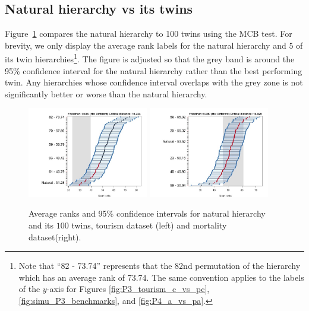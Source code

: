 \documentclass[a4paper,review,12pt,authoryear]{elsarticle}
\begin{document}
\subsection{Natural hierarchy vs its twins}

\label{subsec:n_vs_pn}


Figure~\ref{fig:P2_tourism} compares the natural hierarchy to 100 twins using the MCB test. For brevity, we only display the average rank labels for the natural hierarchy and $5$ of its twin hierarchies\footnote{Note that ``82 - 73.74'' represents that the $82$nd permutation of the hierarchy which has an average rank of 73.74. The same convention applies to the labels of the $y$-axis for Figures \ref{fig:P3_tourism_c_vs_pc},  \ref{fig:simu_P3_benchmarks}, and \ref{fig:P4_a_vs_pa}.}. The figure is adjusted so that the grey band is around the 95\% confidence interval for the natural hierarchy rather than the best performing twin. Any hierarchies whose confidence interval overlaps with the grey zone is not significantly better or worse than the natural hierarchy. 

\begin{figure}[!h]
    \centering
    \includegraphics[width=0.47\textwidth]{../figures/Figure6_tourism_natural_vs_pn.jpg}
    \centering    \includegraphics[width=0.47\textwidth]{../figures/Figure6_mortality_natural_vs_pn.jpg}
    \caption{\label{fig:P2_tourism}Average ranks and 95\% confidence intervals for natural hierarchy and its $100$ twins, tourism dataset (left) and mortality dataset(right).}
\end{figure}
 
\end{document}
